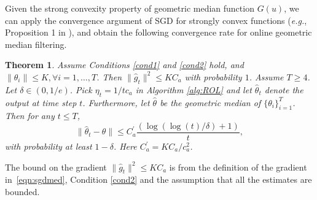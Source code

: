 \documentclass[11pt]{article}
\newtheorem{theorem}{Theorem}
\begin{document}
Given the strong convexity property of geometric median function $ G(u) $, we  can apply the convergence argument of  SGD  for strongly convex functions (\emph{e.g.}, Proposition 1 in \cite{rakhlin2011making}), and obtain the following convergence rate for online geometric median filtering.
\begin{theorem}
	\label{theo:converge_rate}
	Assume Conditions \ref{cond1} and \ref{cond2} hold, and $ \|\theta_i\| \leq K, \forall i=1,\ldots,T $.  Then  $ \|\widehat{g}_t\|^2 \leq K C_a $ with probability $1$.   Assume $ T \geq 4 $. Let $ \delta \in (0,1/e) $. Pick $ \eta_t= {1}/{t c_a } $ in Algorithm \ref{alg:ROL} and let $\widehat{\theta}_t$ denote the output at time step $t$. Furthermore,  let $ \widehat{\theta} $ be the geometric median of $ \{\theta_i\}_{i=1}^T $. Then for any $ t \leq T $,
	\begin{equation*}
	\|\widehat{\theta}_t - \widehat{\theta}\| \leq C_a^\prime \frac{( \log(\log(t)/\delta)+1)}{ t},
	\end{equation*}
	with probability at least $ 1-\delta $. Here $ C_a^\prime = KC_a/c_a^2 $.
\end{theorem}
The bound on the gradient $ \|\widehat{g}_t\|^2 \leq K C_a  $ is from the definition of the gradient in~\eqref{eqn:sgdmed}, Condition \ref{cond2} and the assumption that all the estimates are bounded.
\end{document}

